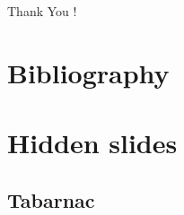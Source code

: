 \documentclass[xcolor={usenames,dvipsnames},hyperref={pdfusetitle}]{beamer}
\begin{document}
\setcounter{finalframe}{\value{framenumber}}

\begin{frame}{}
    \centering
    \Huge
    Thank You !
\end{frame}

\section*{Bibliography}
%



\section*{Hidden slides}

\subsection*{Tabarnac}
\end{document}
